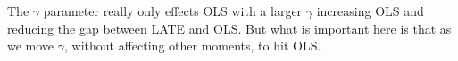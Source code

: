\documentclass[pdftex,11pt]{article}
\begin{document}
The $\gamma$ parameter really only effects OLS with a larger $\gamma$ increasing OLS and reducing the gap between LATE and OLS. But what is important here is that as we move $\gamma$, without affecting other moments, to hit OLS.





\end{document}
